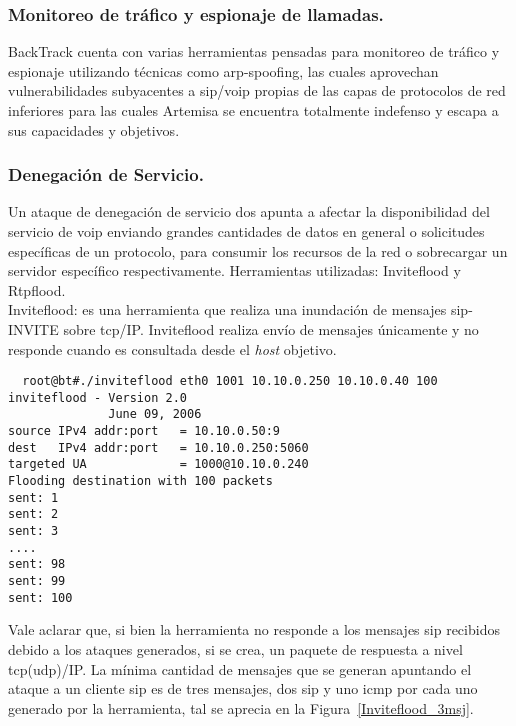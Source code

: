 \documentclass[a4paper,12pt]{report}
\newenvironment{myscriptlisting}
{\begin{list}{}{\setlength{\leftmargin}{1em}}\item\scriptsize\bfseries}
{\end{list}}
\begin{document}
\subsubsection{Monitoreo de tráfico y espionaje de llamadas.\\}
BackTrack cuenta con varias herramientas pensadas para monitoreo de tráfico y 
espionaje utilizando técnicas como  \ac{arp}-spoofing, las cuales aprovechan
vulnerabilidades subyacentes a \ac{sip}/\ac{voip} propias de las capas de protocolos de
red  inferiores para las cuales Artemisa se encuentra totalmente indefenso y
escapa a sus capacidades y objetivos.


\subsubsection{Denegación de Servicio.\\}
Un ataque de denegación de servicio \ac{dos} apunta a afectar 
la disponibilidad del servicio de \ac{voip} enviando grandes cantidades de datos en
general o solicitudes específicas de un protocolo, para consumir los recursos de
la red o sobrecargar un servidor específico respectivamente. Herramientas
utilizadas: Inviteflood y Rtpflood.\\

Inviteflood: es una herramienta que realiza una inundación de mensajes \ac{sip}-INVITE sobre 
\ac{tcp}/IP. Inviteflood realiza envío de mensajes únicamente y no responde cuando es
consultada desde el \emph{host} objetivo. 

\begin{myscriptlisting}
 \begin{verbatim}
  root@bt#./inviteflood eth0 1001 10.10.0.250 10.10.0.40 100 
inviteflood - Version 2.0
              June 09, 2006
source IPv4 addr:port   = 10.10.0.50:9
dest   IPv4 addr:port   = 10.10.0.250:5060
targeted UA             = 1000@10.10.0.240
Flooding destination with 100 packets
sent: 1
sent: 2
sent: 3
....
sent: 98
sent: 99
sent: 100

 \end{verbatim}
\end{myscriptlisting}

Vale aclarar que, si bien la herramienta no responde a los mensajes \ac{sip} 
recibidos debido a los ataques generados, si se crea, un paquete de respuesta a
nivel \ac{tcp}(\ac{udp})/IP.
La mínima cantidad de mensajes que se generan apuntando el ataque a un cliente 
\ac{sip} es de tres mensajes, dos \ac{sip} y uno \ac{icmp} por cada uno generado por la
herramienta, tal se aprecia en la Figura~\ref{Inviteflood_3msj}.
\end{document}
